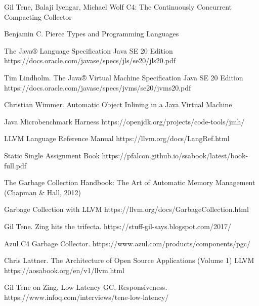 \begingroup 
\renewcommand{\section}[2]{\anonsection{Библиографический список}}
\begin{flushleft}
\begin{thebibliography}{}

Gil Tene, Balaji Iyengar, Michael Wolf C4: The Continuously Concurrent Compacting Collector

Benjamin C. Pierce Types and Programming Languages

The Java® Language Specification Java SE 20 Edition 
https://docs.oracle.com/javase/specs/jls/se20/jls20.pdf

Tim Lindholm. The Java® Virtual Machine Specification Java SE 20 Edition https://docs.oracle.com/javase/specs/jvms/se20/jvms20.pdf
	
Christian Wimmer. Automatic Object Inlining in a Java Virtual Machine

Java Microbenchmark Harness https://openjdk.org/projects/code-tools/jmh/
	
	LLVM Language Reference Manual https://llvm.org/docs/LangRef.html
	
Static Single Assignment Book https://pfalcon.github.io/ssabook/latest/book-full.pdf
	
The Garbage Collection Handbook: The Art of Automatic Memory Management (Chapman \& Hall, 2012)
	
Garbage Collection with LLVM https://llvm.org/docs/GarbageCollection.html
	
Gil Tene. Zing hits the trifecta. https://stuff-gil-says.blogspot.com/2017/

Azul C4 Garbage Collector. https://www.azul.com/products/components/pgc/

Chris Lattner. The Architecture of Open Source Applications (Volume 1) LLVM https://aosabook.org/en/v1/llvm.html

Gil Tene on Zing, Low Latency GC, Responsiveness. https://www.infoq.com/interviews/tene-low-latency/
\end{thebibliography}
\end{flushleft}
\endgroup

\clearpage
